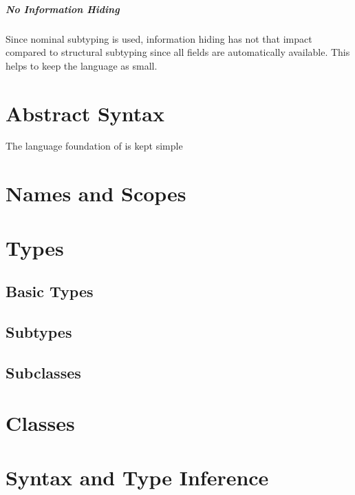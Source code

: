 \paragraph{No Information Hiding}
Since nominal subtyping is used, information hiding has not that impact
compared to structural subtyping since all fields are automatically
available. This helps to keep the language as small.

\chapter{Abstract Syntax}
The language foundation of \ooplss is kept simple

\chapter{Names and Scopes}

\chapter{Types}
\section{Basic Types}
\section{Subtypes}
\section{Subclasses}

\chapter{Classes}

\chapter{Syntax and Type Inference}
